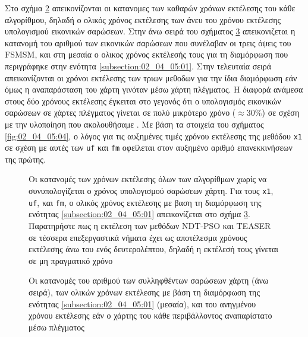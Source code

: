 \begin{figure}[!h]\vspace{3cm}%
  
  \vspace{1cm}
  \caption{}
  \label{}
\end{figure}

Στο σχήμα \ref{fig:02_04_05:02} απεικονίζονται οι κατανομες των καθαρών χρόνων
εκτέλεσης του κάθε αλγορίθμου, δηλαδή ο ολικός χρόνος εκτέλεσης των άνευ του
χρόνου εκτέλεσης υπολογισμού εικονικών σαρώσεων. Στην άνω σειρά του σχήματος
\ref{fig:02_04_05:03} απεικονιζεται η κατανομή του αριθμού των εικονικών
σαρώσεων που συνέλαβαν οι τρεις όψεις του FSMSM, και στη μεσαία ο ολικος χρόνος
εκτέλεσής τους για τη διαμόρφωση που περιγράφηκε στην ενότητα
\ref{subsection:02_04_05:01}. Στην τελευταία σειρά απεικονίζονται οι χρόνοι
εκτέλεσης των τριων μεθοδων για την ίδια διαμόρφωση εάν όμως η αναπαράσταση του
χάρτη γινόταν μέσω χάρτη πλέγματος. Η διαφορά ανάμεσα στους δύο χρόνους
εκτέλεσης έγκειται στο γεγονός ότι ο υπολογισμός εικονικών σαρώσεων σε χάρτες
πλέγματος γίνεται σε πολύ μικρότερο χρόνο ($\approx 30\%$) σε σχέση με την
υλοποίηση που ακολουθήσαμε \cite{Walsh2018}. Με βάση τα στοιχεία του σχήματος
\ref{fig:02_04_05:04}, ο λόγος για τις αυξημένες τιμές χρόνου εκτέλεσης της
μεθόδου \texttt{x1} σε σχέση με αυτές των \texttt{uf} και \texttt{fm} οφείλεται
στον αυξημένο αριθμό επανεκκινήσεων της πρώτης.

\begin{figure}[!h]
  
  \vspace{1cm}
  \caption{\small Οι κατανομές των χρόνων εκτέλεσης όλων των αλγορίθμων χωρίς να
           συνυπολογίζεται ο χρόνος υπολογισμού σαρώσεων χάρτη. Για τους
           \texttt{x1}, \texttt{uf}, και \texttt{fm}, ο ολικός χρόνος εκτέλεσης
           με βαση τη διαμόρφωση της ενότητας \ref{subsection:02_04_05:01}
           απεικονίζεται στο σχήμα \ref{fig:02_04_05:03}. Παρατηρήστε πως η
           εκτέλεση των μεθόδων NDT-PSO και TEASER σε τέσσερα επεξεργαστικά
           νήματα έχει ως αποτέλεσμα χρόνους εκτέλεσης άνω του ενός
           δευτερολέπτου, δηλαδή η εκτέλεσή τους γίνεται σε μη πραγματικό
           χρόνο}
  \label{fig:02_04_05:02}
\end{figure}

\begin{figure}[!h]
  
  \vspace{1cm}
  \caption{\small Οι κατανομές του αριθμού των συλληφθέντων σαρώσεων χάρτη (άνω
           σειρά), των ολικών χρόνων εκτέλεσης με βάση τη διαμόρφωση της
           ενότητας \ref{subsection:02_04_05:01} (μεσαία), και του ανηγμένου
           χρόνου εκτέλεσης εάν ο χάρτης του κάθε περιβάλλοντος αναπαρίστατο
           μέσω πλέγματος}
  \label{fig:02_04_05:03}
\end{figure}

